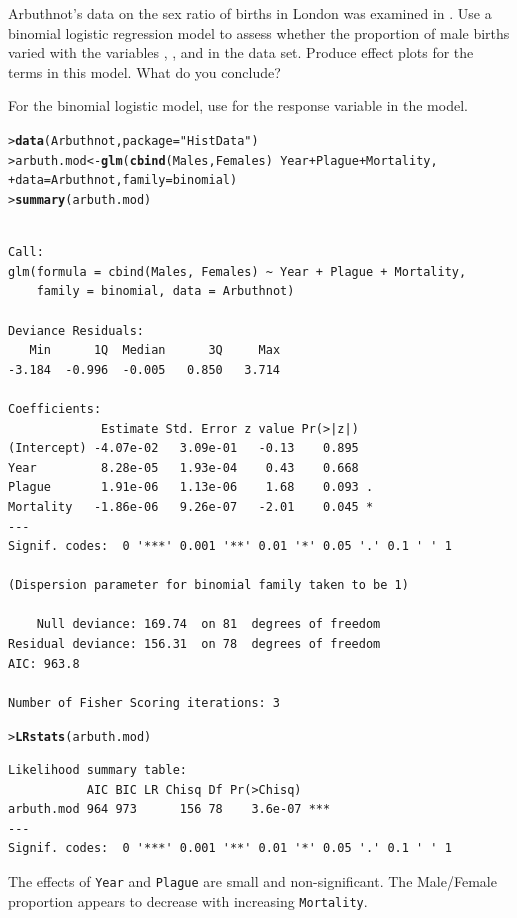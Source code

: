 \documentclass[10pt]{report}\usepackage[]{graphicx}\usepackage[]{color}
\makeatletter
\newcommand{\hlstr}[1]{\textcolor[rgb]{0.192,0.494,0.8}{#1}}%
\newcommand{\hlopt}[1]{\textcolor[rgb]{0,0,0}{#1}}%
\newcommand{\hlstd}[1]{\textcolor[rgb]{0.345,0.345,0.345}{#1}}%
\newcommand{\hlkwb}[1]{\textcolor[rgb]{0.69,0.353,0.396}{#1}}%
\newcommand{\hlkwc}[1]{\textcolor[rgb]{0.333,0.667,0.333}{#1}}%
\newcommand{\hlkwd}[1]{\textcolor[rgb]{0.737,0.353,0.396}{\textbf{#1}}}%
\newenvironment{kframe}{%
 \def\at@end@of@kframe{}%
 \ifinner\ifhmode%
  \def\at@end@of@kframe{\end{minipage}}%
  \begin{minipage}{\columnwidth}%
 \fi\fi%
 \def\FrameCommand##1{\hskip\@totalleftmargin \hskip-\fboxsep
 \colorbox{shadecolor}{##1}\hskip-\fboxsep
     \hskip-\linewidth \hskip-\@totalleftmargin \hskip\columnwidth}%
 \MakeFramed {\advance\hsize-\width
   \@totalleftmargin\z@ \linewidth\hsize
   \@setminipage}}%
 {\par\unskip\endMakeFramed%
 \at@end@of@kframe}
\newenvironment{knitrout}{}{} %
\renewenvironment{knitrout}{\small\renewcommand{\baselinestretch}{.85}}{} %
\makeatother
\begin{document}
\begin{Exercises}

 \exercise Arbuthnot's data on the sex ratio of births in London was examined
 in .  Use a binomial logistic regression model to
 assess whether the proportion of male births varied with the variables
 , , and  in the 
 data set.  Produce effect plots for the terms in this model. What do you
 conclude?
	\begin{ans}
	  For the binomial logistic model, use  for
	  the response variable in the model.
\begin{knitrout}\footnotesize
{}\color{fgcolor}\begin{kframe}
\begin{alltt}
\hlstd{> }\hlkwd{data}\hlstd{(Arbuthnot,} \hlkwc{package}\hlstd{=}\hlstr{"HistData"}\hlstd{)}
\hlstd{> }\hlstd{arbuth.mod} \hlkwb{<-} \hlkwd{glm}\hlstd{(}\hlkwd{cbind}\hlstd{(Males, Females)} \hlopt{~} \hlstd{Year} \hlopt{+} \hlstd{Plague} \hlopt{+} \hlstd{Mortality,}
\hlstd{+ }                  \hlkwc{data}\hlstd{=Arbuthnot,} \hlkwc{family}\hlstd{=binomial)}
\hlstd{> }\hlkwd{summary}\hlstd{(arbuth.mod)}
\end{alltt}
\begin{verbatim}

Call:
glm(formula = cbind(Males, Females) ~ Year + Plague + Mortality, 
    family = binomial, data = Arbuthnot)

Deviance Residuals: 
   Min      1Q  Median      3Q     Max  
-3.184  -0.996  -0.005   0.850   3.714  

Coefficients:
             Estimate Std. Error z value Pr(>|z|)  
(Intercept) -4.07e-02   3.09e-01   -0.13    0.895  
Year         8.28e-05   1.93e-04    0.43    0.668  
Plague       1.91e-06   1.13e-06    1.68    0.093 .
Mortality   -1.86e-06   9.26e-07   -2.01    0.045 *
---
Signif. codes:  0 '***' 0.001 '**' 0.01 '*' 0.05 '.' 0.1 ' ' 1

(Dispersion parameter for binomial family taken to be 1)

    Null deviance: 169.74  on 81  degrees of freedom
Residual deviance: 156.31  on 78  degrees of freedom
AIC: 963.8

Number of Fisher Scoring iterations: 3
\end{verbatim}
\begin{alltt}
\hlstd{> }\hlkwd{LRstats}\hlstd{(arbuth.mod)}
\end{alltt}
\begin{verbatim}
Likelihood summary table:
           AIC BIC LR Chisq Df Pr(>Chisq)    
arbuth.mod 964 973      156 78    3.6e-07 ***
---
Signif. codes:  0 '***' 0.001 '**' 0.01 '*' 0.05 '.' 0.1 ' ' 1
\end{verbatim}
\end{kframe}
\end{knitrout}
    The effects of \texttt{Year} and \texttt{Plague} are small and non-significant.
    The Male/Female proportion appears to decrease with increasing \texttt{Mortality}.


\end{ans}
\end{Exercises}
\end{document}
